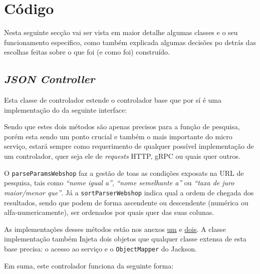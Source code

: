\section{Código}

Nesta seguinte secção vai ser vista em maior detalhe algumas classes e o seu funcionamento especifico, como também explicada algumas decisões po detrás das escolhas feitas sobre o que foi (e como foi) construído.

\subsection{\textit{JSON Controller}}

Esta classe de controlador estende o controlador base que por sí é uma implementação do da seguinte interface:



Sendo que estes dois métodos são apenas precisos para a função de pesquisa, porém esta sendo um ponto crucial e também o mais importante do micro serviço, estará sempre como requerimento de qualquer possível implementação de um controlador, quer seja ele de \textit{requests} HTTP, gRPC ou quais quer outros.

O \texttt{parseParamsWebshop} faz a gestão de toas as condições exposats na URL de pesquisa, tais como \textit{``nome igual a''}, \textit{``nome semelhante a''} ou \textit{``taxa de juro maior/menor que''}. Já a \texttt{sortParserWebshop} indica qual a ordem de chegada dos resultados, sendo que podem de forma ascendente ou descendente (numérica ou alfa-numericamente), ser ordenados por quais quer das suas colunas.

As implementações desses métodos estão nos anexos \hyperref[an1]{um} e \hyperref[an2]{dois}. A classe implementação também Injeta dois objetos que qualquer classe extensa de esta base precisa: o acesso ao serviço e o \texttt{ObjectMapper} do Jackson.


Em suma, este controlador funciona da seguinte forma:

